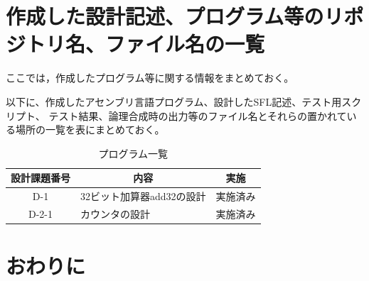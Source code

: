 \documentclass{jarticle}[11pt]
\begin{document}

\section{作成した設計記述、プログラム等のリポジトリ名、ファイル名の一覧}
\label{sec:作成した設計記述、プログラム等のリポジトリ名、ファイル名の一覧}

ここでは，作成したプログラム等に関する情報をまとめておく。


以下に、作成したアセンブリ言語プログラム、設計したSFL記述、テスト用スクリプト、
テスト結果、論理合成時の出力等のファイル名とそれらの置かれている場所の一覧を表にまとめておく。

\begin{table}[htb] %
\caption{プログラム一覧}
\label{プログラム一覧}
\begin{center}
\begin{tabular}{c|p{6cm}|p{4cm}}
\hline \hline
設計課題番号 & 
\multicolumn{1}{c}{内容} &
\multicolumn{1}{|c}{実施} 
\\ \hline

D-1 &
32ビット加算器add32の設計 &
実施済み 
\\

D-2-1 &
カウンタの設計 &
実施済み 
\\

\hline
\end{tabular}
\end{center}
\end{table}


\section{おわりに}
\label{sec:おわりに}
% 
\end{document}
